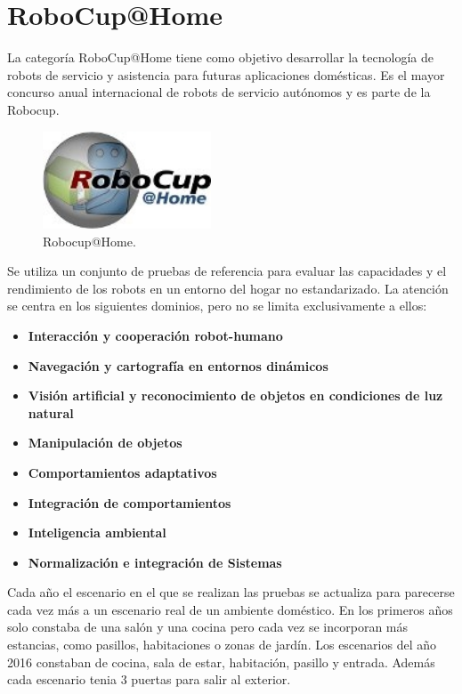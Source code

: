 \section{RoboCup@Home}
\label{cap:robocup}
La categoría RoboCup@Home tiene como objetivo desarrollar la tecnología de robots de servicio y asistencia para futuras aplicaciones domésticas. Es el mayor concurso anual internacional de robots de servicio autónomos y es parte de la Robocup.

\begin{figure} [hbtp]
  \begin{center}
    \includegraphics[width=5cm]{img/cap1/logoRobocupHome}
  \end{center}
  \caption{Robocup@Home.}
  \label{fig:logoRobocupHome}
\end{figure}

Se utiliza un conjunto de pruebas de referencia  para evaluar las capacidades y el rendimiento de los robots en un entorno del hogar no estandarizado. La atención se centra en los siguientes dominios, pero no se limita exclusivamente a ellos:

\begin{itemize}
\item \textbf{Interacción y cooperación robot-humano} 
\item \textbf{Navegación y cartografía en entornos dinámicos} 
\item \textbf{Visión artificial y reconocimiento de objetos en condiciones de luz natural} 
\item \textbf{Manipulación de objetos} 
\item \textbf{Comportamientos adaptativos} 
\item \textbf{Integración de comportamientos}
\item \textbf{Inteligencia ambiental}  
\item \textbf{Normalización e integración de Sistemas}  
\end{itemize}

Cada año el escenario en el que se realizan las pruebas se actualiza para parecerse cada vez más a un escenario real de un ambiente doméstico. En los primeros años solo constaba de una salón y una cocina pero cada vez se incorporan más estancias, como pasillos, habitaciones o zonas de jardín. Los escenarios del año 2016 constaban de cocina, sala de estar, habitación, pasillo y entrada. Además cada escenario tenia 3 puertas para salir al exterior.

